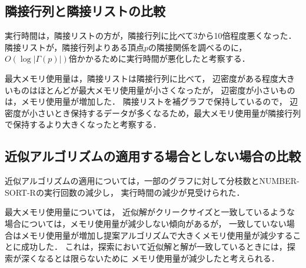 \subsection{隣接行列と隣接リストの比較}
実行時間は，隣接リストの方が，隣接行列に比べて3から10倍程度悪くなった．
隣接リストが，隣接行列よりある頂点$p$の隣接関係を調べるのに，$O(\log | \Gamma(p) |)$倍かかるために実行時間が悪化したと考察する．

最大メモリ使用量は，隣接リストは隣接行列に比べて，
辺密度がある程度大きいものはほとんどが最大メモリ使用量が小さくなったが，
辺密度が小さいものは，メモリ使用量が増加した．
隣接リストを補グラフで保持しているので，
辺密度が小さいとき保持するデータが多くなるため，最大メモリ使用量が隣接行列で保持するより大きくなったと考察する．

\subsection{近似アルゴリズムの適用する場合としない場合の比較}
近似アルゴリズムの適用については，一部のグラフに対して分枝数とNUMBER-SORT-Rの実行回数の減少し，
実行時間の減少が見受けられた．

最大メモリ使用量については，
近似解がクリークサイズと一致しているような場合については，メモリ使用量が減少しない傾向があるが，
一致していない場合はメモリ使用量が増加し提案アルゴリズムで大きくメモリ使用量が減少することに成功した．
これは，探索において近似解と解が一致しているときには，探索が深くなるとは限らないために
メモリ使用量が減少したと考えられる．



